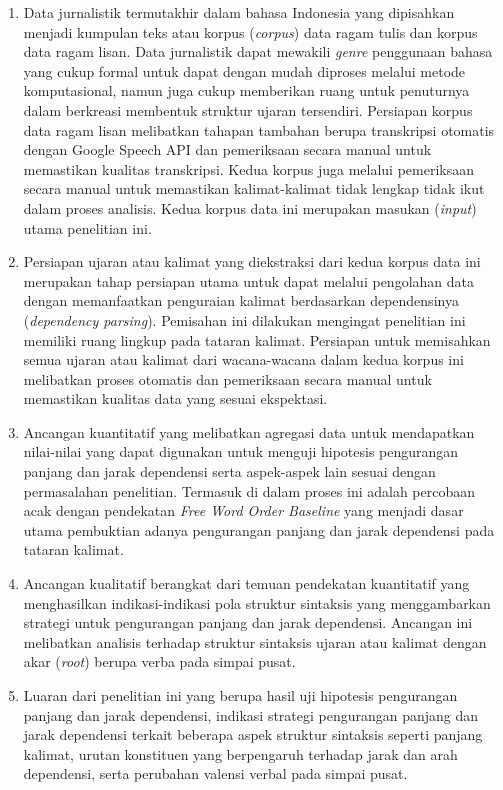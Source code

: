 \begin{enumerate}
	\item Data jurnalistik termutakhir dalam bahasa Indonesia yang dipisahkan menjadi kumpulan teks atau korpus (\textit{corpus}) data ragam tulis dan korpus data ragam lisan. Data jurnalistik dapat mewakili \textit{genre} penggunaan bahasa yang cukup formal untuk dapat dengan mudah diproses melalui metode komputasional, namun juga cukup memberikan ruang untuk penuturnya dalam berkreasi membentuk struktur ujaran tersendiri. Persiapan korpus data ragam lisan melibatkan tahapan tambahan berupa transkripsi otomatis dengan Google Speech API dan pemeriksaan secara manual untuk memastikan kualitas transkripsi. Kedua korpus juga melalui pemeriksaan secara manual untuk memastikan kalimat-kalimat tidak lengkap tidak ikut dalam proses analisis. Kedua korpus data ini merupakan masukan (\textit{input}) utama penelitian ini.
	\item Persiapan ujaran atau kalimat yang diekstraksi dari kedua korpus data ini merupakan tahap persiapan utama untuk dapat melalui pengolahan data dengan memanfaatkan penguraian kalimat berdasarkan dependensinya (\textit{dependency parsing}). Pemisahan ini dilakukan mengingat penelitian ini memiliki ruang lingkup pada tataran kalimat. Persiapan untuk memisahkan semua ujaran atau kalimat dari wacana-wacana dalam kedua korpus ini melibatkan proses otomatis dan pemeriksaan secara manual untuk memastikan kualitas data yang sesuai ekspektasi. 
	\item Ancangan kuantitatif yang melibatkan agregasi data untuk mendapatkan nilai-nilai yang dapat digunakan untuk menguji hipotesis pengurangan panjang dan jarak dependensi serta aspek-aspek lain sesuai dengan permasalahan penelitian. Termasuk di dalam proses ini adalah percobaan acak dengan pendekatan \textit{Free Word Order Baseline} yang menjadi dasar utama pembuktian adanya pengurangan panjang dan jarak dependensi pada tataran kalimat.
	\item Ancangan kualitatif berangkat dari temuan pendekatan kuantitatif yang menghasilkan indikasi-indikasi pola struktur sintaksis yang menggambarkan strategi untuk pengurangan panjang dan jarak dependensi. Ancangan ini melibatkan analisis terhadap struktur sintaksis ujaran atau kalimat dengan akar (\textit{root}) berupa verba pada simpai pusat. 
	\item Luaran dari penelitian ini yang berupa hasil uji hipotesis pengurangan panjang dan jarak dependensi, indikasi strategi pengurangan panjang dan jarak dependensi terkait beberapa aspek struktur sintaksis seperti panjang kalimat, urutan konstituen yang berpengaruh terhadap jarak dan arah dependensi, serta perubahan valensi verbal pada simpai pusat.
\end{enumerate}

